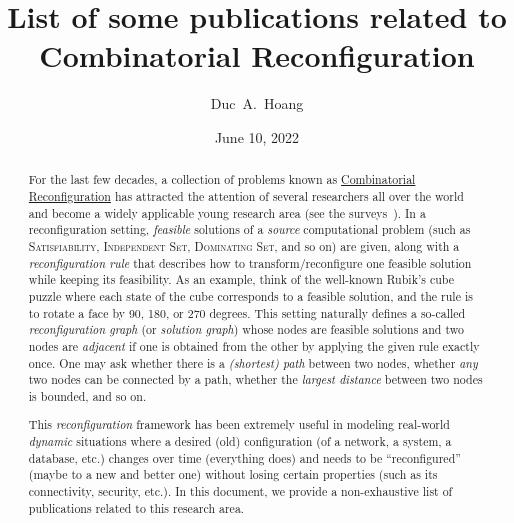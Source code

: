 \documentclass[a4paper]{article}
\title{List of some publications related to Combinatorial Reconfiguration}
\author{Duc~A.~Hoang}
\date{June 10, 2022}
\begin{document}
	\nocite{*}
	
	\maketitle
	
	\begin{abstract}
		For the last few decades, a collection of problems known as \href{https://en.wikipedia.org/wiki/Reconfiguration}{Combinatorial Reconfiguration} has attracted the attention of several researchers all over the world and become a widely applicable young research area (see the surveys~\cite{books/cu/p/Heuvel13,journals/algorithms/Nishimura18,conf/seiccgtc/MynhardtN19}).
		In a reconfiguration setting, \textit{feasible} solutions of a \textit{source} computational problem (such as \textsc{Satisfiability}, \textsc{Independent Set}, \textsc{Dominating Set}, and so on) are given, along with a \textit{reconfiguration rule} that describes how to transform/reconfigure one feasible solution while keeping its feasibility.
		As an example, think of the well-known Rubik's cube puzzle where each state of the cube corresponds to a feasible solution, and the rule is to rotate a face by 90, 180, or 270 degrees.
		This setting naturally defines a so-called \textit{reconfiguration graph} (or \textit{solution graph}) whose nodes are feasible solutions and two nodes are \textit{adjacent} if one is obtained from the other by applying the given rule exactly once.
		One may ask whether there is a \textit{(shortest) path} between two nodes, whether \textit{any} two nodes can be connected by a path, whether the \textit{largest distance} between two nodes is bounded, and so on.
		
		This \textit{reconfiguration} framework has been extremely useful in modeling real-world \textit{dynamic} situations where a desired (old) configuration (of a network, a system, a database, etc.) changes over time (everything does) and needs to be ``reconfigured'' (maybe to a new and better one) without losing certain properties (such as its connectivity, security, etc.).
		In this document, we provide a non-exhaustive list of publications related to this research area.
	\end{abstract}
	
	\clearpage
	
	\tableofcontents
	
	\clearpage
	
 	\printbibbyyear
\end{document}
